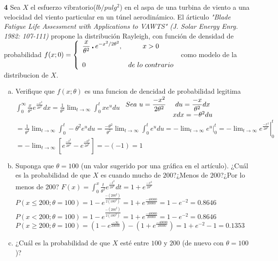 \documentclass[12pt, letterpaper]{article}
\begin{document}
\textbf{4} Sea $X$ el esfuerzo vibratorio($lb/pulg^2$) en el aspa de una turbina de viento a una velocidad del viento particular en un túnel aerodinámico. El árticulo \textit{"Blade Fatigue Life Assessment with Applications to VAWTS" (J. Solar Energy Enrg. 1982: 107-111)} propone la distribución Rayleigh, con función de densidad de probabilidad\vskip0.1cm
$f(x;0)=\left\{\begin{array}{l c}
	\displaystyle\frac{x}{\theta ^2}\centerdot e^{-x^2/2\theta ^2}, & x>0\\ \\
	0 & de\ lo\ contrario
\end{array}\right.$\vskip0.5cm
como modelo de la distribucion de $X$.\vskip0.5cm
\begin{enumerate}[a)]
	\item Verifique  que $f(x;\theta)$ es una funcion de dencidad de probabilidad legitima\\
		$\displaystyle\int_0^\infty\displaystyle\frac{x}{\theta^2}e^{\frac{-x^2}{2\theta^2}}dx=\displaystyle\frac{1}{\theta^2}\lim_{t\to\infty}\int_0^txe^udu$
		$\begin{array}{l c}
			Sea\ u=\displaystyle\frac{-x^2}{2\theta^2} & du = \displaystyle\frac{-x}{\theta^2}dx\\
		 	& xdx=-\theta^2du
		\end{array}$\vskip0.1cm
		$=\displaystyle\frac{1}{\theta^2}\lim_{t\to\infty}\int_0^t-\theta^2e^udu=\displaystyle\frac{-\theta^2}{\theta^2}\lim_{t\to\infty}\int_0^te^udu=-\left.\lim_{t\to\infty}e^u\right|_0^t=-\left.\lim_{t\to\infty}e^{\frac{-x^2}{2\theta^2}}\right|_0^t$\vskip0.1cm$=-\displaystyle\lim_{t\to\infty}\left[e^{\frac{-t^2}{2\theta^2}} - e^{\frac{-0^2}{2\theta^2}}\right]=-(-1)=1$
	\item Suponga que $\theta = 100$ (un valor sugerido por una gráfica en el artículo). ¿Cuál es la probabilidad de que $X$ es cuando mucho de $200$?¿Menos de $200$?¿Por lo menos de 200?\vskip0.1cm
		$F(x) = \displaystyle\int_0^x\frac{t}{\theta^2}e^{\frac{-t^2}{2\theta^2}}dt=1+e^{\frac{-x^2}{2\theta^2}}$\\
		$P(x\leq200;\theta=100) = 1-e^{\frac{-(200^2)}{2(100^2)}}=1+e^{\frac{-40000}{20000}}=1-e^{-2}=0.8646$\vskip0.1cm
		$P(x<200;\theta=100) = 1-e^{\frac{-(200^2)}{2(100^2)}}=1+e^{\frac{-40000}{20000}}=1-e^{-2}=0.8646$\vskip0.1cm
		$P(x\geq200;\theta=100)=\left(1-e^{\frac{-\infty}{20000}}\right) - \left(1+e^{\frac{-40000}{20000}} \right) = 1 + e^{-2} - 1 = 0.1353$
	\item ¿Cuál es la probabilidad de que $X$ esté entre $100$ y $200$ (de nuevo con $\theta=100$)?\vskip0.01cm

\end{enumerate}
\end{document}
